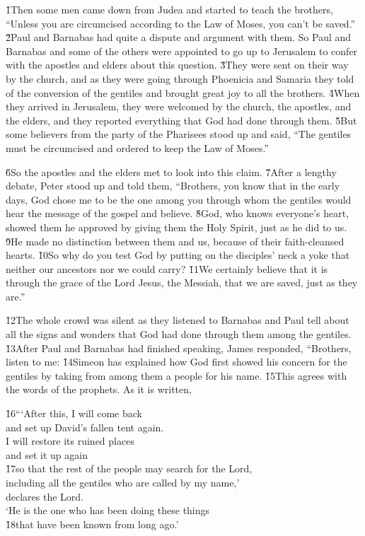 \v{1}Then some men came down from Judea and started to teach the brothers, ``Unless you are circumcised according to the Law of Moses, you can't be saved.'' \v{2}Paul and Barnabas had quite a dispute and argument with them. So Paul and Barnabas and some of the others were appointed to go up to Jerusalem to confer with the apostles and elders about this question. \v{3}They were sent on their way by the church, and as they were going through Phoenicia and Samaria they told of the conversion of the gentiles and brought great joy to all the brothers. \v{4}When they arrived in Jerusalem, they were welcomed by the church, the apostles, and the elders, and they reported everything that God had done through them. \v{5}But some believers from the party of the Pharisees stood up and said, ``The gentiles must be circumcised and ordered to keep the Law of Moses.''

\v{6}So the apostles and the elders met to look into this claim. \v{7}After a lengthy debate, Peter stood up and told them, ``Brothers, you know that in the early days, God chose me to be the one among you through whom the gentiles would hear the message of the gospel and believe. \v{8}God, who knows everyone's heart, showed them he approved by giving them the Holy Spirit, just as he did to us. \v{9}He made no distinction between them and us, because of their faith-cleansed hearts. \v{10}So why do you test God by putting on the disciples' neck a yoke that neither our ancestors nor we could carry? \v{11}We certainly believe that it is through the grace of the Lord Jesus, the Messiah, that we are saved, just as they are.''

\v{12}The whole crowd was silent as they listened to Barnabas and Paul tell about all the signs and wonders that God had done through them among the gentiles. \v{13}After Paul and Barnabas had finished speaking, James responded, ``Brothers, listen to me: \v{14}Simeon has explained how God first showed his concern for the gentiles by taking from among them a people for his name. \v{15}This agrees with the words of the prophets. As it is written,

\begin{poetry}
\poeml \v{16}```After this, I will come back \\
\poemll    and set up David's fallen tent again. \\
\poeml I will restore its ruined places \\
\poemll    and set it up again \\
\poeml \v{17}so that the rest of the people may search for the Lord, \\
\poemll    including all the gentiles who are called by my name,' \\
\poemlll       declares the Lord. \\
\poeml `He is the one who has been doing these things \\
\poemll    \v{18}that have been known from long ago.'
\end{poetry}

